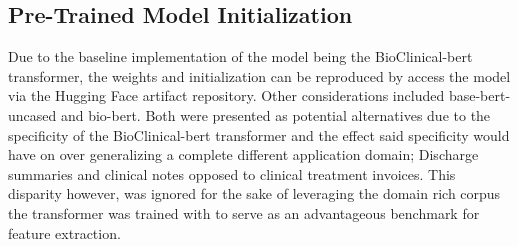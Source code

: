 \documentclass{article}
\begin{document}
    \subsection{Pre-Trained Model Initialization}
    Due to the baseline implementation of the model being the BioClinical-bert transformer, the weights and initialization can be reproduced by access the model via the Hugging Face artifact repository. Other considerations included base-bert-uncased and bio-bert. Both were presented as potential alternatives due to the specificity of the BioClinical-bert transformer and the effect said specificity would have on over generalizing a complete different application domain; Discharge summaries and clinical notes opposed to clinical treatment invoices. This disparity however, was ignored for the sake of leveraging the domain rich corpus the transformer was trained with to serve as an advantageous benchmark for feature extraction. 
\end{document}
